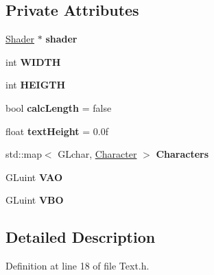 \subsection*{Private Attributes}
\begin{DoxyCompactItemize}
\item 
\hyperlink{class_shader}{Shader} $\ast$ {\bfseries shader}\hypertarget{class_text_a50e97faa1729cd7eac3a177904e1e5a6}{}\label{class_text_a50e97faa1729cd7eac3a177904e1e5a6}

\item 
int {\bfseries W\+I\+D\+TH}\hypertarget{class_text_ae58c29280eefc2bb9741791709f1fb39}{}\label{class_text_ae58c29280eefc2bb9741791709f1fb39}

\item 
int {\bfseries H\+E\+I\+G\+TH}\hypertarget{class_text_ac9ccfb4ff928907085b69bf1f9cec87f}{}\label{class_text_ac9ccfb4ff928907085b69bf1f9cec87f}

\item 
bool {\bfseries calc\+Length} = false\hypertarget{class_text_a938381281ab752b62a032945bf443071}{}\label{class_text_a938381281ab752b62a032945bf443071}

\item 
float {\bfseries text\+Height} = 0.\+0f\hypertarget{class_text_a838c8d252c14ea3e2cde0e3df2fd3728}{}\label{class_text_a838c8d252c14ea3e2cde0e3df2fd3728}

\item 
std\+::map$<$ G\+Lchar, \hyperlink{struct_text_1_1_character}{Character} $>$ {\bfseries Characters}\hypertarget{class_text_aa3d063fcb04f34d0b2ed7a40d5fddbf2}{}\label{class_text_aa3d063fcb04f34d0b2ed7a40d5fddbf2}

\item 
G\+Luint {\bfseries V\+AO}\hypertarget{class_text_a485e2c31f7a6d7a5a7d360f00818d751}{}\label{class_text_a485e2c31f7a6d7a5a7d360f00818d751}

\item 
G\+Luint {\bfseries V\+BO}\hypertarget{class_text_aaac524c6d42c895e6cbf962538f72b3a}{}\label{class_text_aaac524c6d42c895e6cbf962538f72b3a}

\end{DoxyCompactItemize}


\subsection{Detailed Description}


Definition at line 18 of file Text.\+h.




